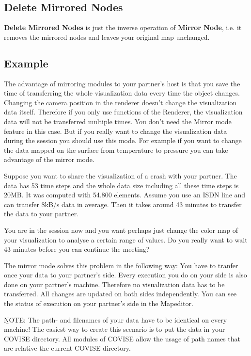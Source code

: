 \subsection{Delete Mirrored Nodes}

{\bf Delete Mirrored Nodes} is just the inverse operation of {\bf Mirror Node}, i.e. it removes the mirrored nodes
and leaves your original map unchanged.

\subsection{Example}

The advantage of mirroring modules to your partner's host is that you save the time of transferring the whole visualization
data every time the object changes. Changing the camera position in the renderer doesn't change the visualization data itself.
Therefore if you only use functions of the Renderer, the visualization data will not be transferred multiple times. You don't need the 
Mirror mode feature in this case.
But if you really want to change the visualization data during the session you should use this mode. For example if you want to change the 
data mapped on the surface from temperature to pressure you can take advantage of the mirror mode.

Suppose you want to share the visualization of a crash with your partner. The data has 53 time steps and the whole data size
including all these time steps is 20MB. It was computed with 54.800 elements. Assume
you use an ISDN line and can transfer 8kB/s data in average. Then it takes around 43 minutes to transfer the data to your partner.

You are in the session now and you want perhaps just change the color map of your visualization to analyse a certain
range of values. Do you really want to wait 43 minutes before you can continue the meeting?

The mirror mode solves this problem in the following way: You have to tranfer once your data to your partner's side. 
Every execution you do on your side is also done on your partner's machine. Therefore no visualization data has to be transferred.
All changes are updated on both sides independently. You can see the status of execution on your partner's side in the Mapeditor.

{\b NOTE:} The path- and filenames of your data have to be identical on every machine! The easiest way to create this scenario
is to put the data in your COVISE directory. All modules of COVISE allow the usage of path names that are relative the current COVISE directory. 
  

